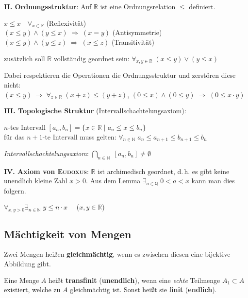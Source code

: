 \vspace{12pt}
\linie

\textbf{II. Ordnungsstruktur}: Auf $\mathbb{R}$ ist eine Ordnungsrelation $\le$
definiert.

$x \le x \quad \forall_{x \in \mathbb{R}}$ (Reflexivität) \\
$(x \le y) \land (y \le x) \;\Rightarrow\; (x = y)$ (Antisymmetrie) \\
$(x \le y) \land (y \le z) \;\Rightarrow\; (x \le z)$ (Transitivität)

zusätzlich soll $\mathbb{R}$ vollständig geordnet sein:
$\forall_{x, y \in \mathbb{R}}\; (x \le y) \lor (y \le x)$

Dabei respektieren die Operationen die Ordnungsstruktur und zerstören diese
nicht: \\
$(x \le y) \;\Rightarrow\; \forall_{z \in \mathbb{R}}\; (x + z) \le (y + z)$,
\qquad
$(0 \le x) \land (0 \le y) \;\Rightarrow\; (0 \le x \cdot y)$

\linie

\textbf{III. Topologische Struktur} (Intervallschachtelungsaxiom):

$n$-tes Intervall
$[a_n, b_n] = \{x \in \mathbb{R} \;|\; a_n \le x \le b_n\}$ \\
für das $n+1$-te Intervall muss gelten:
$\forall_{n \in \mathbb{N}}\; a_n \le a_{n+1} \le b_{n+1} \le b_n$

\emph{Intervallschachtelungsaxiom}:
$\bigcap_{n \in \mathbb{N}}\; [a_n, b_n] \not= \emptyset$

\linie

\textbf{IV. Axiom von \textsc{Eudoxus}}: $\mathbb{R}$ ist archimedisch
geordnet, d.\,h. es gibt keine unendlich kleine Zahl $x > 0$.
Aus dem Lemma $\exists_{a \in \mathbb{Q}}\; 0 < a < x$ kann man dies folgern.

$\forall_{x, y > 0} \exists_{n \in \mathbb{N}}\; y \le n \cdot x \quad$
($x, y \in \mathbb{R}$)

\subsection{%
    Mächtigkeit von Mengen%
}

Zwei Mengen heißen \textbf{gleichmächtig}, wenn es zwischen diesen eine
bijektive Abbildung gibt.

Eine Menge $A$ heißt \textbf{transfinit} (\textbf{unendlich}), wenn eine
\emph{echte} Teilmenge $A_1 \subset A$ existiert, welche zu $A$ gleichmächtig
ist. Sonst heißt sie \textbf{finit} (\textbf{endlich}).

